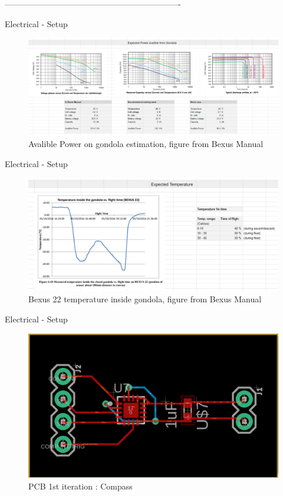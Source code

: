 \documentclass[11pt, aspectratio=169]{beamer}
\begin{document}
----------------------------------------------------------------


    \begin{frame}[c]{Electrical - Setup}
   		\begin{figure}[H]
            \includegraphics[width=.6\textwidth]{electrical/Backup-avaliblePower.png}
           	\caption{Avalible Power on gondola estimation, figure from Bexus Manual}
        \end{figure}
    \end{frame}
    
    
    \begin{frame}[c]{Electrical - Setup}
   		\begin{figure}[H]
            \includegraphics[width=.6\textwidth]{electrical/Backup-bexus22temp.png}
           	\caption{Bexus 22 temperature inside gondola, figure from Bexus Manual}
        \end{figure}
    \end{frame}

    \begin{frame}[c]{Electrical - Setup}
   		\begin{figure}[H]
            \includegraphics[width=.6\textwidth]{electrical/PCB_compass.png}
           	\caption{PCB 1st iteration : Compass}
        \end{figure}
    \end{frame}
\end{document}
